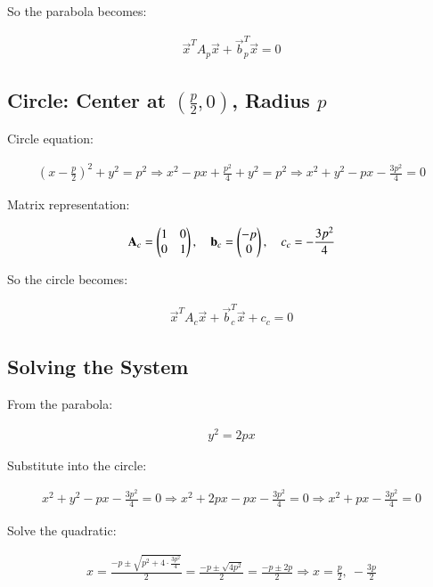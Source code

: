 \documentclass{article}
\begin{document}
So the parabola becomes:


\begin{align}
\vec{x}^T A_p \vec{x} + \vec{b}_p^T \vec{x} = 0
\end{align}



\subsection*{Circle: Center at $(\frac{p}{2}, 0)$, Radius $p$}

Circle equation:


\begin{align}
(x - \frac{p}{2})^2 + y^2 = p^2
\Rightarrow x^2 - px + \frac{p^2}{4} + y^2 = p^2
\Rightarrow x^2 + y^2 - px - \frac{3p^2}{4} = 0
\end{align}



Matrix representation:


\begin{align}
\mathbf{A}_c = \begin{pmatrix}1 & 0 \\ 0 & 1\end{pmatrix}, \quad
\mathbf{b}_c = \begin{pmatrix}-p \\ 0\end{pmatrix}, \quad
c_c = -\frac{3p^2}{4}
\end{align}



So the circle becomes:


\begin{align}
\vec{x}^T A_c \vec{x} + \vec{b}_c^T \vec{x} + c_c = 0
\end{align}



\subsection*{Solving the System}

From the parabola:

\begin{align}
y^2 = 2px
\end{align}


Substitute into the circle:

\begin{align}
x^2 + y^2 - px - \frac{3p^2}{4} = 0
\Rightarrow x^2 + 2px - px - \frac{3p^2}{4} = 0
\Rightarrow x^2 + px - \frac{3p^2}{4} = 0
\end{align}



Solve the quadratic:


\begin{align}
x = \frac{-p \pm \sqrt{p^2 + 4 \cdot \frac{3p^2}{4}}}{2}
= \frac{-p \pm \sqrt{4p^2}}{2}
= \frac{-p \pm 2p}{2}
\Rightarrow x = \frac{p}{2},\ -\frac{3p}{2}
\end{align}
\end{document}
